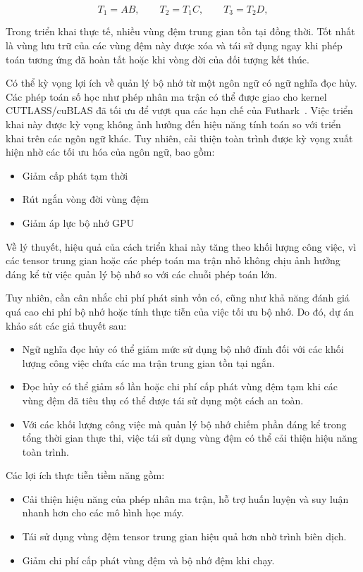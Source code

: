 \documentclass[a4paper]{article}
\begin{document}
	\begin{equation}
		T_1 = A B,\qquad
		T_2 = T_1 C,\qquad
		T_3 = T_2 D,
	\end{equation}
	
	Trong triển khai thực tế, nhiều vùng đệm trung gian tồn tại đồng thời. Tốt nhất là vùng lưu trữ của các vùng đệm này được xóa và tái sử dụng ngay khi phép toán tương ứng đã hoàn tất hoặc khi vòng đời của đối tượng kết thúc.
	
	Có thể kỳ vọng lợi ích về quản lý bộ nhớ từ một ngôn ngữ có ngữ nghĩa đọc hủy. Các phép toán số học như phép nhân ma trận có thể được giao cho kernel CUTLASS/cuBLAS đã tối ưu để vượt qua các hạn chế của Futhark~\cite{futhark}. Việc triển khai này được kỳ vọng không ảnh hưởng đến hiệu năng tính toán so với triển khai trên các ngôn ngữ khác. Tuy nhiên, cải thiện toàn trình được kỳ vọng xuất hiện nhờ các tối ưu hóa của ngôn ngữ, bao gồm:
	\begin{itemize} 
		\item Giảm cấp phát tạm thời
		\item Rút ngắn vòng đời vùng đệm
		\item Giảm áp lực bộ nhớ GPU
	\end{itemize}
	Về lý thuyết, hiệu quả của cách triển khai này tăng theo khối lượng công việc, vì các tensor trung gian hoặc các phép toán ma trận nhỏ không chịu ảnh hưởng đáng kể từ việc quản lý bộ nhớ so với các chuỗi phép toán lớn.
	
	Tuy nhiên, cần cân nhắc chi phí phát sinh vốn có, cũng như khả năng đánh giá quá cao chi phí bộ nhớ hoặc tính thực tiễn của việc tối ưu bộ nhớ. Do đó, dự án khảo sát các giả thuyết sau:
	
	\begin{itemize}
		\item Ngữ nghĩa đọc hủy có thể giảm mức sử dụng bộ nhớ đỉnh đối với các khối lượng công việc chứa các ma trận trung gian tồn tại ngắn.
		\item Đọc hủy có thể giảm số lần hoặc chi phí cấp phát vùng đệm tạm khi các vùng đệm đã tiêu thụ có thể được tái sử dụng một cách an toàn.
		\item Với các khối lượng công việc mà quản lý bộ nhớ chiếm phần đáng kể trong tổng thời gian thực thi, việc tái sử dụng vùng đệm có thể cải thiện hiệu năng toàn trình.
	\end{itemize}
	
	Các lợi ích thực tiễn tiềm năng gồm:
	
	\begin{itemize}
		\item Cải thiện hiệu năng của phép nhân ma trận, hỗ trợ huấn luyện và suy luận nhanh hơn cho các mô hình học máy.
		\item Tái sử dụng vùng đệm tensor trung gian hiệu quả hơn nhờ trình biên dịch.
		\item Giảm chi phí cấp phát vùng đệm và bộ nhớ đệm khi chạy.
	\end{itemize}
	
\end{document}
